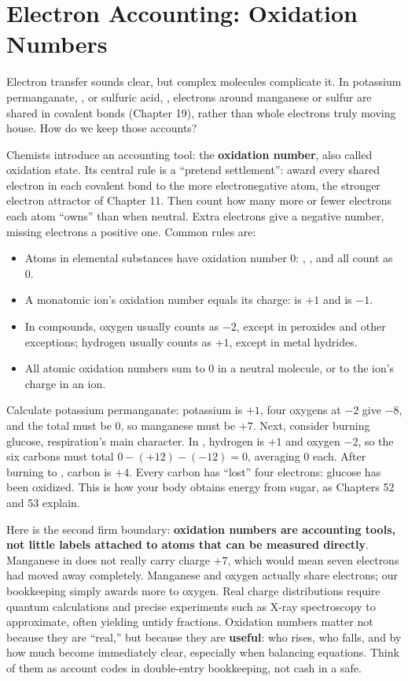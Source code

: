 \section{Electron Accounting: Oxidation Numbers}

Electron transfer sounds clear, but complex molecules complicate it. In potassium permanganate, , or sulfuric acid, , electrons around manganese or sulfur are shared in covalent bonds (Chapter 19), rather than whole electrons truly moving house. How do we keep those accounts?

Chemists introduce an accounting tool: the \textbf{oxidation number}, also called oxidation state. Its central rule is a ``pretend settlement'': award every shared electron in each covalent bond to the more electronegative atom, the stronger electron attractor of Chapter 11. Then count how many more or fewer electrons each atom ``owns'' than when neutral. Extra electrons give a negative number, missing electrons a positive one. Common rules are:

\begin{itemize}[itemsep=2pt]
\item Atoms in elemental substances have oxidation number 0: , , and  all count as 0.
\item A monatomic ion's oxidation number equals its charge:  is $+1$ and  is $-1$.
\item In compounds, oxygen usually counts as $-2$, except in peroxides and other exceptions; hydrogen usually counts as $+1$, except in metal hydrides.
\item All atomic oxidation numbers sum to 0 in a neutral molecule, or to the ion's charge in an ion.
\end{itemize}

Calculate potassium permanganate: potassium is $+1$, four oxygens at $-2$ give $-8$, and the total must be 0, so manganese must be $+7$. Next, consider burning glucose, respiration's main character. In , hydrogen is $+1$ and oxygen $-2$, so the six carbons must total $0-(+12)-(-12)=0$, averaging 0 each. After burning to , carbon is $+4$. Every carbon has ``lost'' four electrons: glucose has been oxidized. This is how your body obtains energy from sugar, as Chapters 52 and 53 explain.

Here is the second firm boundary: \textbf{oxidation numbers are accounting tools, not little labels attached to atoms that can be measured directly}. Manganese in  does not really carry charge $+7$, which would mean seven electrons had moved away completely. Manganese and oxygen actually share electrons; our bookkeeping simply awards more to oxygen. Real charge distributions require quantum calculations and precise experiments such as X-ray spectroscopy to approximate, often yielding untidy fractions. Oxidation numbers matter not because they are ``real,'' but because they are \textbf{useful}: who rises, who falls, and by how much become immediately clear, especially when balancing equations. Think of them as account codes in double-entry bookkeeping, not cash in a safe.

